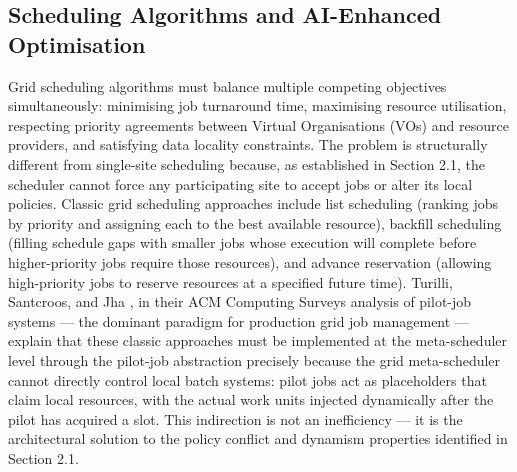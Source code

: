 \documentclass[12pt,a4paper]{report}
\begin{document}
  \subsection*{Scheduling Algorithms and AI-Enhanced Optimisation}
  Grid scheduling algorithms must balance multiple competing objectives simultaneously: minimising job turnaround time, maximising resource utilisation, 
  respecting priority agreements between Virtual Organisations (VOs) and resource providers, and satisfying data locality constraints. The problem is
   structurally different from single-site scheduling because, as established in Section 2.1, the scheduler cannot force any participating site to 
   accept jobs or alter its local policies. Classic grid scheduling approaches include list scheduling (ranking jobs by priority and assigning each 
   to the best available resource), backfill scheduling (filling schedule gaps with smaller jobs whose execution will complete before higher-priority 
   jobs require those resources), and advance reservation (allowing high-priority jobs to reserve resources at a specified future time). Turilli, 
   Santcroos, and Jha \parencite{turilli2018pilot}, in their ACM Computing Surveys analysis of pilot-job systems — the dominant paradigm for production grid job management
    — explain that these classic approaches must be implemented at the meta-scheduler level through the pilot-job abstraction precisely because the grid 
    meta-scheduler cannot directly control local batch systems: pilot jobs act as placeholders that claim local resources, with the actual work units 
    injected dynamically after the pilot has acquired a slot. This indirection is not an inefficiency — it is the architectural solution to the policy 
    conflict and dynamism properties identified in Section 2.1.
\end{document}
